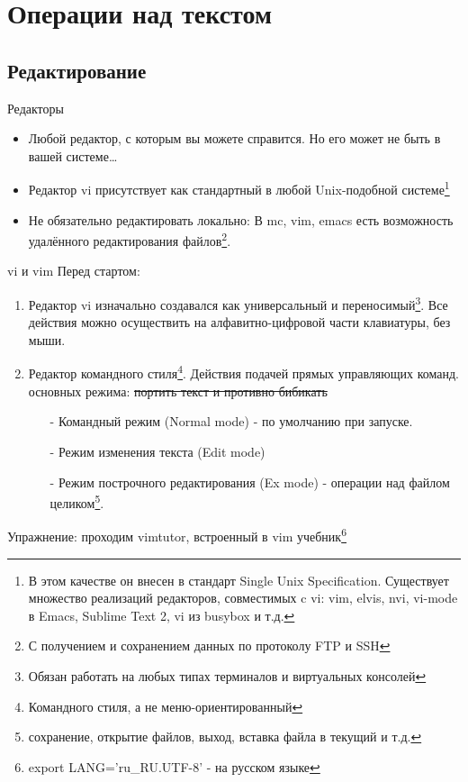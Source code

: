 \section{Операции над текстом}



\subsection{Редактирование}
\begin{frame}{Редакторы}

  \begin{itemize}
    \item  Любой редактор, с которым вы можете справится. \pause Но его может не быть в вашей системе\ldots \pause
    \item Редактор \alert{vi} присутствует как стандартный в любой Unix-подобной системе\footnote{В этом качестве он внесен в стандарт Single Unix Specification. Существует множество реализаций редакторов, совместимых c vi: vim, elvis, nvi, vi-mode в Emacs, Sublime Text 2, vi из busybox и т.д.} \pause
    \item Не обязательно редактировать локально: В \alert{mc}, \alert{vim}, \alert{emacs} есть возможность удалённого редактирования файлов\footnote{С получением и сохранением данных по протоколу FTP и SSH}.
  \end{itemize}

\end{frame}

\begin{frame}{vi и vim}
  Перед стартом:

  \begin{enumerate}
    \item  Редактор vi изначально создавался как универсальный и переносимый\footnote{Обязан работать на любых типах терминалов и виртуальных консолей}. Все действия можно осуществить на алфавитно-цифровой части клавиатуры, без мыши. \pause
    \item \alert{Редактор командного стиля}\footnote{Командного стиля, а не меню-ориентированный}. Действия подачей прямых управляющих команд. \pause {} основных режима: \sout{портить текст и противно бибикать}
      \begin{itemize}
	\item[-] \alert{Командный режим} (Normal mode) - по умолчанию при запуске.
	\item[-] \alert{Режим изменения текста} (Edit mode)
	\item[-] \alert{Режим построчного редактирования} (Ex mode) - операции над файлом целиком\footnote{сохранение, открытие файлов, выход, вставка файла в текущий и т.д.}.
      \end{itemize}
  \end{enumerate} \pause
  \alert{Упражнение}: проходим \alert{vimtutor}, встроенный в vim учебник\footnote{ export LANG='ru\_RU.UTF-8' - на русском языке }
\end{frame}

